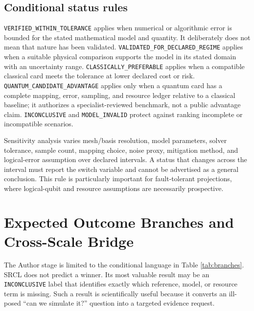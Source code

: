 \documentclass[conference]{../../../../Conference-LaTeX-template_10-17-19/IEEEtran}
\begin{document}
\subsection{Conditional status rules}
\texttt{VERIFIED\_WITHIN\_TOLERANCE} applies when numerical or algorithmic error is bounded for the stated mathematical model and quantity. It deliberately does not mean that nature has been validated. \texttt{VALIDATED\_FOR\_DECLARED\_REGIME} applies when a suitable physical comparison supports the model in its stated domain with an uncertainty range. \texttt{CLASSICALLY\_PREFERABLE} applies when a compatible classical card meets the tolerance at lower declared cost or risk. \texttt{QUANTUM\_CANDIDATE\_ADVANTAGE} applies only when a quantum card has a complete mapping, error, sampling, and resource ledger relative to a classical baseline; it authorizes a specialist-reviewed benchmark, not a public advantage claim. \texttt{INCONCLUSIVE} and \texttt{MODEL\_INVALID} protect against ranking incomplete or incompatible scenarios.

Sensitivity analysis varies mesh/basis resolution, model parameters, solver tolerance, sample count, mapping choice, noise proxy, mitigation method, and logical-error assumption over declared intervals. A status that changes across the interval must report the switch variable and cannot be advertised as a general conclusion. This rule is particularly important for fault-tolerant projections, where logical-qubit and resource assumptions are necessarily prospective.

\section{Expected Outcome Branches and Cross-Scale Bridge}
The Author stage is limited to the conditional language in Table \ref{tab:branches}. SRCL does not predict a winner. Its most valuable result may be an \texttt{INCONCLUSIVE} label that identifies exactly which reference, model, or resource term is missing. Such a result is scientifically useful because it converts an ill-posed “can we simulate it?” question into a targeted evidence request.
\end{document}
